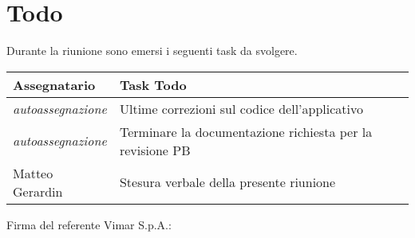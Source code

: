 \section{Todo}
Durante la riunione sono emersi i seguenti task da svolgere.

\begin{center}
    \begin{tabular}{|L{5cm}|L{8cm}|}
        \hline
        \textbf{Assegnatario} & \textbf{Task Todo} \\ \hline
        \textit{autoassegnazione} &  Ultime correzioni sul codice dell'applicativo \\ \hline
        \textit{autoassegnazione} &  Terminare la documentazione richiesta per la revisione PB \\ \hline
        Matteo Gerardin &  Stesura verbale della presente riunione \\ \hline
    \end{tabular}
\end{center}

\vspace{4cm}
\noindent Firma del referente Vimar S.p.A.: \underline{\hspace{5cm}}
